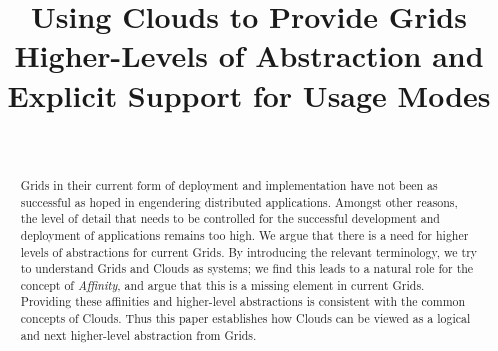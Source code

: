 \documentclass[conference,final]{IEEEtran}
\newcommand{\I}[1]{\textit{#1}}
\begin{document}
\title{\large Using Clouds to Provide Grids Higher-Levels of
  Abstraction and Explicit Support for Usage Modes}

\author{\\[-.5em]

        }

\maketitle

\begin{abstract}

  Grids in their current form of deployment and implementation have
  not been as successful as hoped in engendering distributed
  applications.  Amongst other reasons, the level of detail that needs
  to be controlled for the successful development and deployment of
  applications remains too high.  We argue that there is a need for
  higher levels of abstractions for current Grids.  By introducing the
  relevant terminology, we try to understand Grids and Clouds as
  systems; we find this leads to a natural role for the concept of
  \I{Affinity}, and argue that this is a missing element in current
  Grids.  Providing these affinities and higher-level abstractions is
  consistent with the common concepts of Clouds. Thus this paper
  establishes how Clouds can be viewed as a logical and next
  higher-level abstraction from Grids.\\

\end{abstract}
\end{document}
